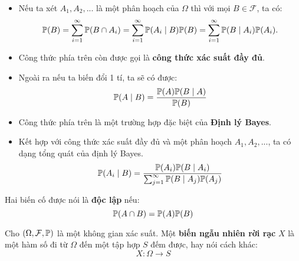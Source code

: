 \begin{itemize}
    \item Nếu ta xét $A_1, A_2, ...$ là một phân hoạch của $\Omega$ thì với mọi $B \in \mathcal{F}$, ta có:
    $$
    \P(B) = \sum_{i=1}^{\infty} \P(B \cap A_i) = \sum_{i=1}^{\infty} \P(A_i \mid B)\P(B) = \sum_{i=1}^{\infty} \P(B \mid A_i)\P(A_i).
    $$

    \item Công thức phía trên còn được gọi là \textbf{công thức xác suất đầy đủ}.

    \item Ngoài ra nếu ta biến đổi 1 tí, ta sẽ có được:
    $$
    \P(A \mid B) = \dfrac{\P(A) \P(B \mid A)}{\P(B)}
    $$

    \item Công thức phía trên là một trường hợp đặc biệt của \textbf{Định lý Bayes}.

    \item Kết hợp với công thức xác suất đầy đủ và một phân hoạch $A_1, A_2, ...$, ta có dạng tổng quát của định lý Bayes.
    $$
    \P(A_i \mid B) = \dfrac{\P(A_i)\P(B \mid A_i)}{\sum_{j=1}^{\infty} \P(B \mid A_j) \P(A_j)}
    $$
\end{itemize}

\begin{defivn}
    Hai biến cố được nói là \textbf{độc lập} nếu:
    $$
    \P(A \cap B) = \P(A) \P(B)
    $$
\end{defivn}



\begin{defivn}
    Cho $(\Omega, \mathcal{F}, \P)$ là một không gian xác suất. Một \textbf{biến ngẫu nhiên rời rạc} $X$ là một hàm số đi từ $\Omega$ đến một tập hợp $S$ đếm được, hay nói cách khác:
    $$
    X: \Omega \to S 
    $$
\end{defivn}

